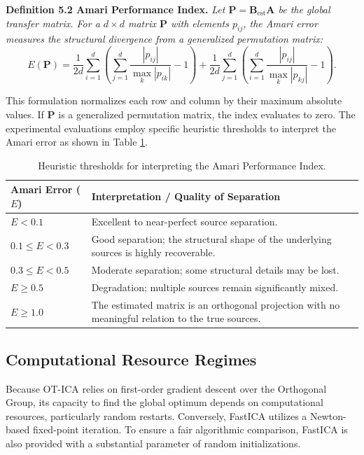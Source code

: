 \documentclass[12pt,a4paper,twoside,openany]{book}
\begin{document}
\vspace{0.5em}
\noindent\textbf{Definition 5.2 Amari Performance Index.} \textit{Let $\mathbf{P} = \mathbf{B}_{\text{est}} \mathbf{A}$ be the global transfer matrix. 
For a $d \times d$ matrix $\mathbf{P}$ with elements $p_{ij}$, the Amari error measures the structural divergence from a generalized permutation matrix:}
\begin{equation}
    E(\mathbf{P}) = \frac{1}{2d} \sum_{i=1}^d \left( \sum_{j=1}^d \frac{|p_{ij}|}{\max_k |p_{ik}|} - 1 \right) + \frac{1}{2d} \sum_{j=1}^d \left( \sum_{i=1}^d \frac{|p_{ij}|}{\max_k |p_{kj}|} - 1 \right).
\end{equation}
\vspace{0.5em}

This formulation normalizes each row and column by their maximum absolute values. 
If $\mathbf{P}$ is a generalized permutation matrix, the index evaluates to zero. 
The experimental evaluations employ specific heuristic thresholds to interpret the Amari error as shown in Table \ref{tab:amari_thresholds}.

\begin{table}[htbp]
    \centering
    \begin{tabular}{@{}lp{10cm}@{}}
        \toprule
        \textbf{Amari Error ($E$)} & \textbf{Interpretation / Quality of Separation} \\
        \midrule
        $E < 0.1$ & Excellent to near-perfect source separation. \\
        \addlinespace
        $0.1 \le E < 0.3$ & Good separation; the structural shape of the underlying sources is highly recoverable. \\
        \addlinespace
        $0.3 \le E < 0.5$ & Moderate separation; some structural details may be lost. \\
        \addlinespace
        $E \ge 0.5$ & Degradation; multiple sources remain significantly mixed. \\
        \addlinespace
        $E \ge 1.0$ & The estimated matrix is an orthogonal projection with no meaningful relation to the true sources. \\
        \bottomrule
    \end{tabular}
    \caption{Heuristic thresholds for interpreting the Amari Performance Index.}
    \label{tab:amari_thresholds}
\end{table}

\subsection{Computational Resource Regimes}
Because OT-ICA relies on first-order gradient descent over the Orthogonal Group, 
its capacity to find the global optimum depends on computational resources, particularly random restarts. 
Conversely, FastICA utilizes a Newton-based fixed-point iteration. To ensure a fair algorithmic comparison, 
FastICA is also provided with a substantial parameter of random initializations. 
\end{document}
